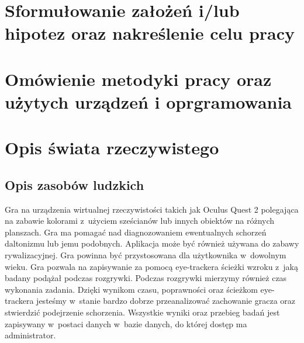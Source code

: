 \documentclass[12pt, letterpaper]{article}
\begin{document}

\section{Sformułowanie założeń i/lub hipotez oraz nakreślenie celu pracy}


\section{Omówienie metodyki pracy oraz użytych urządzeń i oprgramowania}

\newpage


\section{Opis świata rzeczywistego}

	\subsection{Opis zasobów ludzkich}

	Gra na urządzenia wirtualnej rzeczywistości takich jak Oculus Quest 2 polegająca na zabawie kolorami z~użyciem sześcianów lub innych obiektów na różnych planszach. Gra ma pomagać nad diagnozowaniem ewentualnych schorzeń daltonizmu lub jemu podobnych. Aplikacja może być również używana do zabawy rywalizacyjnej. Gra powinna być przystosowana dla użytkownika w~dowolnym wieku. Gra pozwala na zapisywanie za pomocą eye-trackera ścieżki wzroku z~jaką badany podążał podczas rozgrywki. Podczas rozgrywki mierzymy również czas wykonania zadania. Dzięki wynikom czasu, poprawności oraz ścieżkom eye-trackera jesteśmy w~stanie bardzo dobrze przeanalizować zachowanie gracza oraz stwierdzić podejrzenie schorzenia. Wszystkie wyniki oraz przebieg badań jest zapisywany w~postaci danych w~bazie danych, do której dostęp ma administrator.
	
\end{document}

